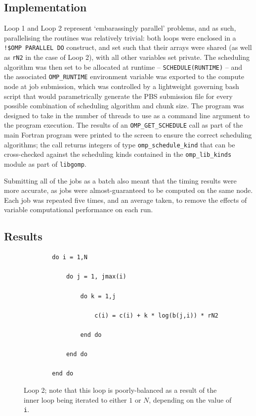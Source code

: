 \documentclass{article} %
\newcommand{\tp}{\texttt}
\begin{document}
\subsection*{Implementation}

Loop 1 and Loop 2 represent `embarassingly parallel' problems, and as such, parallelising the routines was relatively trivial: both loops were enclosed in a \tp{!\$OMP PARALLEL DO} construct, and set such that their arrays were shared (as well as \tp{rN2} in the case of Loop 2), with all other variables set private.
The scheduling algorithm was then set to be allocated at runtime -- \tp{SCHEDULE(RUNTIME)} -- and the associated \tp{OMP\_RUNTIME} environment variable was exported to the compute node at job submission, which was controlled by a lightweight governing bash script that would parametrically generate the PBS submission file for every possible combination of scheduling algorithm and chunk size.
The program was designed to take in the number of threads to use as a command line argument to the program execution.
The results of an \tp{OMP\_GET\_SCHEDULE} call as part of the main Fortran program were printed to the screen to ensure the correct scheduling algorithms; the call returns integers of type \tp{omp\_schedule\_kind} that can be cross-checked against the scheduling kinds contained in the \tp{omp\_lib\_kinds} module as part of \tp{libgomp}.

Submitting all of the jobs as a batch also meant that the timing results were more accurate, as jobs were almost-guaranteed to be computed on the same node.
Each job was repeated five times, and an average taken, to remove the effects of variable computational performance on each run.

\subsection*{Results}



\begin{figure}
    \begin{lstlisting}
        do i = 1,N

            do j = 1, jmax(i) 
        
                do k = 1,j 
                    
                    c(i) = c(i) + k * log(b(j,i)) * rN2
                
                end do
            
            end do
     
        end do
    \end{lstlisting}
    \caption{Loop 2; note that this loop is poorly-balanced as a result of the inner loop being iterated to either $1$ or $N$, depending on the value of \texttt{i}.}
    \label{listing:loop2}
\end{figure}
\end{document}
